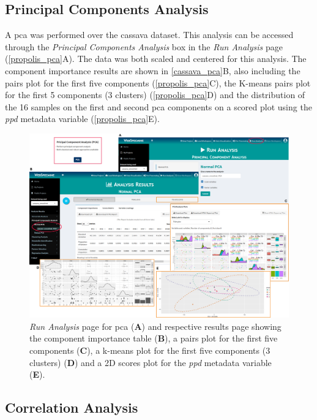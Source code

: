 \subsection{Principal Components Analysis}

A \gls{pca} was performed over the cassava dataset. This analysis can be accessed through the \textit{Principal Components Analysis} box in the \textit{Run Analysis} page (\autoref{propolis_pca}A). The data was both scaled and centered for this analysis. The component importance results are shown in \autoref{cassava_pca}B, also including the pairs plot for the first five components (\autoref{propolis_pca}C), the K-means pairs plot for the first 5 components (3 clusters) (\autoref{propolis_pca}D) and the distribution of the 16 samples on the first and second \gls{pca} components on a scored plot using the \textit{ppd} metadata variable (\autoref{propolis_pca}E). 


\begin{figure}[H]
	\centering
	\includegraphics[width=1\linewidth]{Imagens/CassavaPPD/pca}
	\caption{\textit{Run Analysis} page for \gls{pca} (\textbf{A}) and respective results page showing the component importance table (\textbf{B}), a pairs plot for the first five components (\textbf{C}), a k-means plot for the first five components (3 clusters) (\textbf{D}) and a 2D scores plot for the \textit{ppd} metadata variable (\textbf{E}).}
	\label{cassava_pca}
\end{figure}


\subsection{Correlation Analysis}

